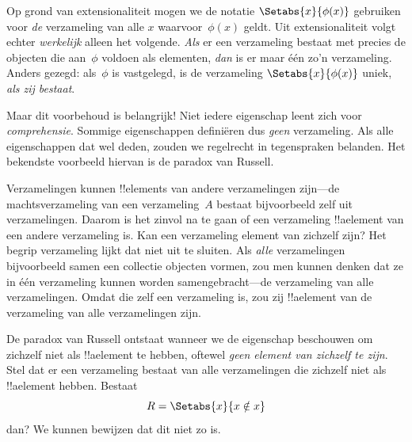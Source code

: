 \documentclass[openany]{memoir}
\begin{document}
\begingroup
\def\olfilename{OLP-0010}
\def\olfilepath{content/sets-functions-relations/sets/}
\hypertarget{unit-OLP-0010}{}





Op grond van extensionaliteit mogen we de notatie
$\Setabs{x}{\phi(x)}$ gebruiken voor \emph{de} verzameling van alle
$x$ waarvoor~$\phi(x)$ geldt. Uit extensionaliteit volgt echter
\emph{werkelijk} alleen het volgende. \emph{Als} er een verzameling
bestaat met precies de objecten die aan~$\phi$ voldoen als elementen,
\emph{dan} is er maar één zo'n verzameling. Anders gezegd: als~$\phi$
is vastgelegd, is de verzameling
$\Setabs{x}{\phi(x)}$ uniek, \emph{als zij bestaat}.

Maar dit voorbehoud is belangrijk!{} Niet iedere eigenschap leent
zich voor \emph{comprehensie}. Sommige eigenschappen definiëren dus
\emph{geen} verzameling. Als alle eigenschappen dat wel deden, zouden
we regelrecht in tegenspraken belanden. Het bekendste voorbeeld
hiervan is de paradox van Russell.

Verzamelingen kunnen !!{element}s van andere verzamelingen zijn---de
machtsverzameling van een verzameling~$A$ bestaat bijvoorbeeld zelf
uit verzamelingen. Daarom is het zinvol na te gaan of een verzameling
!!a{element} van een andere verzameling is. Kan een verzameling
element van zichzelf zijn? Het begrip verzameling lijkt dat niet uit
te sluiten. Als \emph{alle} verzamelingen bijvoorbeeld samen een
collectie objecten vormen, zou men kunnen denken dat ze in één
verzameling kunnen worden samengebracht---de verzameling van alle
verzamelingen. Omdat die zelf een verzameling is, zou zij
!!a{element} van de verzameling van alle verzamelingen zijn.

De paradox van Russell ontstaat wanneer we de eigenschap beschouwen
om zichzelf niet als !!a{element} te hebben, oftewel \emph{geen
element van zichzelf te zijn}. Stel dat er een verzameling bestaat
van alle verzamelingen die zichzelf niet als !!a{element} hebben.
Bestaat
\[
R = \Setabs{x}{x \notin x}
\]
dan? We kunnen bewijzen dat dit niet zo is.
\end{document}
